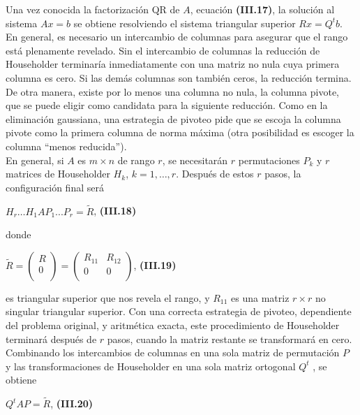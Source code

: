 \documentclass[twocolumn,twoside]{article}
\begin{document}
Una vez conocida la factorizaci\'on QR de $A$, ecuaci\'on \textbf{(III.17)}, la soluci\'on al sistema
$A x = b$ se obtiene resolviendo el sistema triangular superior $R x = Q^t b$.\\
En general, es necesario un intercambio de columnas para asegurar que el rango
est\'a plenamente revelado. Sin el intercambio de columnas la reducci\'on de Householder
terminar\'ia inmediatamente con una matriz no nula cuya primera columna es cero. Si las
dem\'as columnas son tambi\'en ceros, la reducci\'on termina. De otra manera, existe por
lo menos una columna no nula, la columna pivote, que se puede eligir como candidata
para la siguiente reducci\'on. Como en la eliminaci\'on gaussiana, una estrategia de pivoteo
pide que se escoja la columna pivote como la primera columna de norma m\'axima (otra
posibilidad es escoger la columna “menos reducida”).\\
En general, si $A$ es $m\times n$ de rango $r$, se necesitar\'an $r$ permutaciones ${P_k}$ y $r$
matrices de Householder ${H_k}$, $k = 1,\dots , r$. Despu\'es de estos $r$ pasos, la configuraci\'on
final ser\'a  
\begin{center}
  $H_r \dots H_1 A P_1 . . . P_r = \tilde{R} $, \hspace{1cm}\textbf{(III.18)}
\end{center}
donde
\begin{center}
  $\tilde{R} =
  \left(\begin{array}{c}
  R\\ 
  0\\
 \end{array}\right)=
 \left(\begin{array}{cc}
  R_{11}& R_{12}\\ 
  0 & 0\\
 \end{array}\right)
 $, \hspace{0.5cm}\textbf{(III.19)}
\end{center}
es triangular superior que nos revela el rango, y $R_{11}$ es una matriz $ r\times r$ no singular
triangular superior. Con una correcta estrategia de pivoteo, dependiente del problema
original, y aritm\'etica exacta, este procedimiento de Householder terminar\'a despu\'es de $r$
pasos, cuando la matriz restante se transformar\'a en cero. Combinando los intercambios
de columnas en una sola matriz de permutaci\'on $P$ y las transformaciones de Householder
en una sola matriz ortogonal $Q^t$ , se obtiene
\begin{center}
  $Q^t A P = \tilde{R} $, \hspace{2cm}\textbf{(III.20)}
\end{center}
\end{document}

